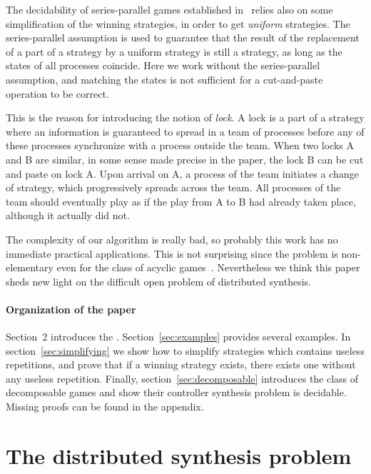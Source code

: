 \documentclass[a4paper,UKenglish]{lipics-v2016}
\begin{document}
The decidability of series-parallel games established in~\cite{gastin} relies also on some simplification of the winning strategies,
in order to get \emph{uniform} strategies. 
The series-parallel assumption is used to guarantee that the result of the replacement of a part of a strategy by a uniform strategy  is still a strategy, as long as the states of all processes coincide. Here we work without the series-parallel assumption,
and matching the states is not sufficient for a cut-and-paste operation to be correct.
 
This is the reason for introducing the notion of \emph{lock}. 
A lock is a part of a strategy where an information is guaranteed to spread in a team of processes before any of these processes synchronize with a process outside the team.
When two locks A and B are similar, in some sense made precise in the paper, the lock B can be cut and paste on lock A. Upon arrival on A, a process of the team initiates a change of strategy, which progressively spreads across the team. All processes of the team should eventually 
play as if the 
play
from A to B had  already taken place, although it actually did not.



The complexity of our algorithm is really bad, so probably this work has no immediate practical applications. This is not surprising
since the problem is non-elementary even for the class of acyclic games~\cite{acyclic}.
Nevertheless we think this paper
sheds new light on the difficult open problem of distributed synthesis.

\paragraph*{Organization of the paper}

Section~2 introduces the \dsp.
Section~\ref{sec:examples} provides several examples. In section~\ref{sec:simplifying} we show how to simplify strategies which contains useless repetitions,
and prove that if a winning strategy exists, there exists one without any useless repetition. Finally, section~\ref{sec:decomposable} introduces the class of decomposable games and show their controller synthesis problem is decidable.
Missing proofs can be found in the appendix. 

\section{The distributed synthesis problem}
\end{document}
